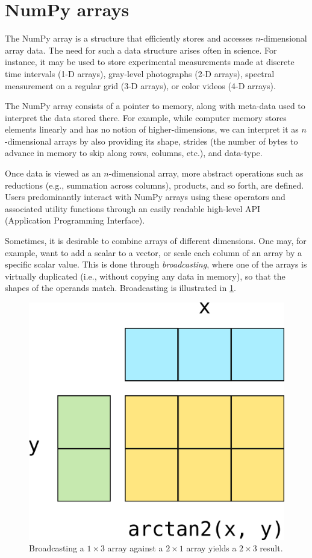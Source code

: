 \section*{NumPy arrays}

The NumPy array is a structure that efficiently stores and accesses $n$-dimensional array data\cite{vanderwalt2011numpy}.  The need for such a data structure arises often in science.  For instance, it may be used to store experimental measurements made at discrete time intervals (1-D arrays), gray-level photographs (2-D arrays), spectral measurement on a regular grid (3-D arrays), or color videos (4-D arrays).

The NumPy array consists of a pointer to memory, along with meta-data used to interpret the data stored there.  For example, while computer memory stores elements linearly and has no notion of higher-dimensions, we can interpret it as $n$-dimensional arrays by also providing its shape, strides (the number of bytes to advance in memory to skip along rows, columns, etc.), and data-type.

Once data is viewed as an $n$-dimensional array, more abstract operations such as reductions (e.g., summation across columns), products, and so forth, are defined. Users predominantly interact with NumPy arrays using these operators and associated utility functions through an easily readable high-level API (Application Programming Interface).

Sometimes, it is desirable to combine arrays of different dimensions.  One may, for example, want to add a scalar to a vector, or scale each column of an array by a specific scalar value.  This is done through {\em broadcasting}, where one of the arrays is virtually duplicated (i.e., without copying any data in memory), so that the shapes of the operands match.  Broadcasting is illustrated in \ref{fig:broadcasting}.

\begin{figure}
  \centering
  \includegraphics[width=0.5\linewidth]{static/broadcasting}
  \caption{
    Broadcasting a $1 \times 3$ array against a $2 \times 1$ array
    yields a $2 \times 3$ result.
  }
  \label{fig:broadcasting}
\end{figure}

